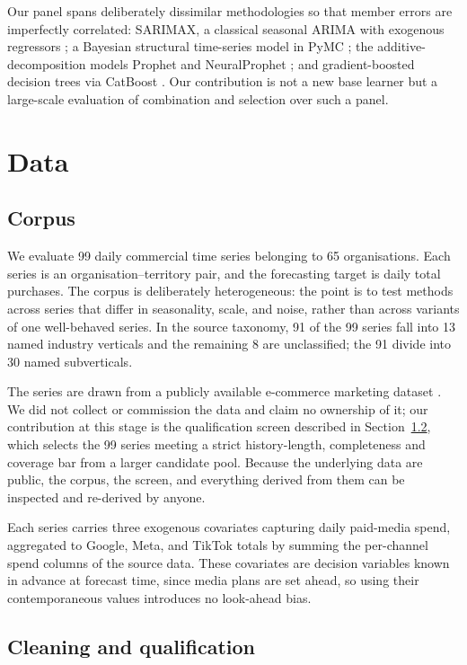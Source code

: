 \documentclass[11pt]{article}
\begin{document}
Our panel spans deliberately dissimilar methodologies so that member errors are imperfectly correlated: SARIMAX, a classical seasonal ARIMA with exogenous regressors \citep{seabold2010}; a Bayesian structural time-series model in PyMC \citep{salvatier2016,abrilpla2023}; the additive-decomposition models Prophet \citep{taylor2018} and NeuralProphet \citep{triebe2021}; and gradient-boosted decision trees via CatBoost \citep{prokhorenkova2018}. Our contribution is not a new base learner but a large-scale evaluation of combination and selection over such a panel.

\section{Data}

\subsection{Corpus}

We evaluate 99 daily commercial time series belonging to 65 organisations. Each series is an organisation--territory pair, and the forecasting target is daily total purchases. The corpus is deliberately heterogeneous: the point is to test methods across series that differ in seasonality, scale, and noise, rather than across variants of one well-behaved series. In the source taxonomy, 91 of the 99 series fall into 13 named industry verticals and the remaining 8 are unclassified; the 91 divide into 30 named subverticals.

The series are drawn from a publicly available e-commerce marketing dataset \citep{anderson2024}. We did not collect or commission the data and claim no ownership of it; our contribution at this stage is the qualification screen described in Section~\ref{sec:cleaning}, which selects the 99 series meeting a strict history-length, completeness and coverage bar from a larger candidate pool. Because the underlying data are public, the corpus, the screen, and everything derived from them can be inspected and re-derived by anyone.

Each series carries three exogenous covariates capturing daily paid-media spend, aggregated to Google, Meta, and TikTok totals by summing the per-channel spend columns of the source data. These covariates are decision variables known in advance at forecast time, since media plans are set ahead, so using their contemporaneous values introduces no look-ahead bias.

\subsection{Cleaning and qualification}
\label{sec:cleaning}
\end{document}

